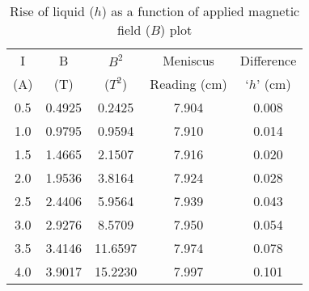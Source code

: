 \begin{table}[H]
    \centering
    \begin{tabular}{|c|c|c|c|c|}
    \hline
     I& B   & $B^2$  & Meniscus & Difference\\ 
    (A)   &    (T)  &  ($T^2$) & Reading (cm) & ‘$h$’ (cm) \\\hline
     0.5 & 0.4925 &  0.2425 & 7.904 & 0.008 \\
     1.0 & 0.9795 &  0.9594 & 7.910 & 0.014 \\
     1.5 & 1.4665 &  2.1507 & 7.916 & 0.020 \\
     2.0 & 1.9536 &  3.8164 & 7.924 & 0.028 \\
     2.5 & 2.4406 &  5.9564 & 7.939 & 0.043 \\
     3.0 & 2.9276 &  8.5709 & 7.950 & 0.054 \\
     3.5 & 3.4146 & 11.6597 & 7.974 & 0.078 \\
     4.0 & 3.9017 & 15.2230 & 7.997 & 0.101 \\
    \hline
    \end{tabular}
    \caption{Rise of liquid ($h$) as a function of applied magnetic field ($B$) plot}
    \label{tab:1}
\end{table}